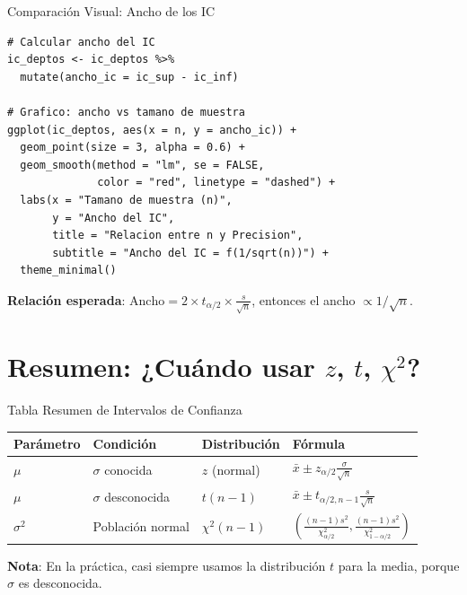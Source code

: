\documentclass[aspectratio=169, 11pt]{beamer}
\begin{document}
\begin{frame}[fragile]{Comparación Visual: Ancho de los IC}
\begin{lstlisting}
# Calcular ancho del IC
ic_deptos <- ic_deptos %>%
  mutate(ancho_ic = ic_sup - ic_inf)

# Grafico: ancho vs tamano de muestra
ggplot(ic_deptos, aes(x = n, y = ancho_ic)) +
  geom_point(size = 3, alpha = 0.6) +
  geom_smooth(method = "lm", se = FALSE,
              color = "red", linetype = "dashed") +
  labs(x = "Tamano de muestra (n)",
       y = "Ancho del IC",
       title = "Relacion entre n y Precision",
       subtitle = "Ancho del IC = f(1/sqrt(n))") +
  theme_minimal()
\end{lstlisting}

\vspace{0.3cm}
\textbf{Relación esperada}: $\text{Ancho} = 2 \times t_{\alpha/2} \times \frac{s}{\sqrt{n}}$, entonces el ancho $\propto 1/\sqrt{n}$.
\end{frame}

\section{Resumen: ¿Cuándo usar $z$, $t$, $\chi^2$?}

\begin{frame}{Tabla Resumen de Intervalos de Confianza}
\begin{table}
\centering
\footnotesize
\begin{tabular}{p{2.5cm}p{2.5cm}p{3cm}p{3cm}}
\toprule
\textbf{Parámetro} & \textbf{Condición} & \textbf{Distribución} & \textbf{Fórmula} \\
\midrule
$\mu$ & $\sigma$ conocida & $z$ (normal) & $\bar{x} \pm z_{\alpha/2} \frac{\sigma}{\sqrt{n}}$ \\[0.3cm]
$\mu$ & $\sigma$ desconocida & $t(n-1)$ & $\bar{x} \pm t_{\alpha/2,n-1} \frac{s}{\sqrt{n}}$ \\[0.3cm]
$\sigma^2$ & Población normal & $\chi^2(n-1)$ & $\left(\frac{(n-1)s^2}{\chi^2_{\alpha/2}}, \frac{(n-1)s^2}{\chi^2_{1-\alpha/2}}\right)$ \\
\bottomrule
\end{tabular}
\end{table}

\vspace{0.3cm}
\textbf{Nota}: En la práctica, casi siempre usamos la distribución $t$ para la media, porque $\sigma$ es desconocida.
\end{frame}
\end{document}
